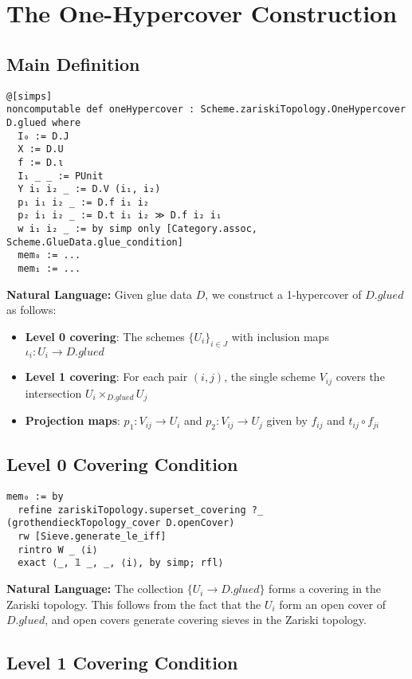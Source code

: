 \documentclass{article}
\theoremstyle{definition}
\begin{document}
\section{The One-Hypercover Construction}

\subsection{Main Definition}

\begin{lstlisting}
@[simps]
noncomputable def oneHypercover : Scheme.zariskiTopology.OneHypercover D.glued where
  I₀ := D.J
  X := D.U
  f := D.ι
  I₁ _ _ := PUnit
  Y i₁ i₂ _ := D.V (i₁, i₂)
  p₁ i₁ i₂ _ := D.f i₁ i₂
  p₂ i₁ i₂ _ := D.t i₁ i₂ ≫ D.f i₂ i₁
  w i₁ i₂ _ := by simp only [Category.assoc, Scheme.GlueData.glue_condition]
  mem₀ := ...
  mem₁ := ...
\end{lstlisting}

\textbf{Natural Language:} Given glue data $D$, we construct a 1-hypercover of $D.glued$ as follows:
\begin{itemize}
\item \textbf{Level 0 covering}: The schemes $\{U_i\}_{i \in J}$ with inclusion maps $\iota_i: U_i \to D.glued$
\item \textbf{Level 1 covering}: For each pair $(i,j)$, the single scheme $V_{ij}$ covers the intersection $U_i \times_{D.glued} U_j$
\item \textbf{Projection maps}: $p_1: V_{ij} \to U_i$ and $p_2: V_{ij} \to U_j$ given by $f_{ij}$ and $t_{ij} \circ f_{ji}$
\end{itemize}

\subsection{Level 0 Covering Condition}

\begin{lstlisting}
mem₀ := by
  refine zariskiTopology.superset_covering ?_ (grothendieckTopology_cover D.openCover)
  rw [Sieve.generate_le_iff]
  rintro W _ ⟨i⟩
  exact ⟨_, 𝟙 _, _, ⟨i⟩, by simp; rfl⟩
\end{lstlisting}

\textbf{Natural Language:} The collection $\{U_i \to D.glued\}$ forms a covering in the Zariski topology. This follows from the fact that the $U_i$ form an open cover of $D.glued$, and open covers generate covering sieves in the Zariski topology.

\subsection{Level 1 Covering Condition}
\end{document}
